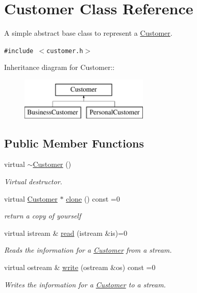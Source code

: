 \hypertarget{classCustomer}{
\section{Customer Class Reference}
\label{classCustomer}
}
A simple abstract base class to represent a \hyperlink{classCustomer}{Customer}.  


{\tt \#include $<$customer.h$>$}

Inheritance diagram for Customer::\begin{figure}[H]
\begin{center}
\leavevmode
\includegraphics[height=2cm]{classCustomer}
\end{center}
\end{figure}
\subsection*{Public Member Functions}
\begin{CompactItemize}
\item 
virtual \hyperlink{classCustomer_7784915654b180d09696edded3db913d}{$\sim$Customer} ()
\begin{CompactList}\small\item\em Virtual destructor. \item\end{CompactList}\item 
virtual \hyperlink{classCustomer}{Customer} $\ast$ \hyperlink{classCustomer_406fb74a887e5f0eb91aa49301534bb4}{clone} () const =0
\begin{CompactList}\small\item\em return a copy of yourself \item\end{CompactList}\item 
virtual istream \& \hyperlink{classCustomer_3327c4e5e7f3a9435f3b71372778386a}{read} (istream \&is)=0
\begin{CompactList}\small\item\em Reads the information for a \hyperlink{classCustomer}{Customer} from a stream. \item\end{CompactList}\item 
virtual ostream \& \hyperlink{classCustomer_a4ef104426d09a4817cb2d55e5e674d0}{write} (ostream \&os) const =0
\begin{CompactList}\small\item\em Writes the information for a \hyperlink{classCustomer}{Customer} to a stream. \item\end{CompactList}\end{CompactItemize}


